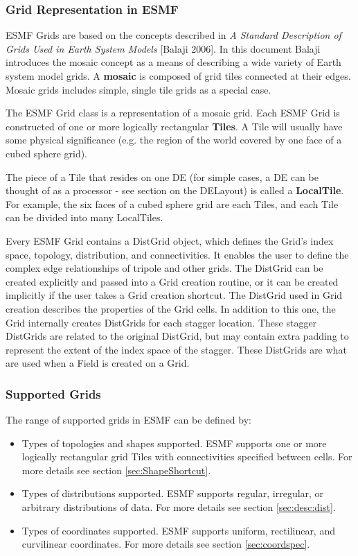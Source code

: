 \subsubsection{Grid Representation in ESMF}

ESMF Grids are based on the concepts described in {\it A Standard
Description of Grids Used in Earth System Models} [Balaji 2006].  In this document
Balaji introduces the mosaic concept as a means of describing
a wide variety of Earth system model grids.  A {\bf mosaic} is
composed of grid tiles connected at their edges.  Mosaic grids
includes simple, single tile grids as a special case.  

The ESMF Grid class is a representation of a mosaic grid.  Each ESMF
Grid is constructed of one or more logically rectangular {\bf Tiles}.
A Tile will usually have some physical significance (e.g. the region
of the world covered by one face of a cubed sphere grid).

The piece of a Tile that resides on one DE (for simple cases, a DE
can be thought of as a processor - see section on the DELayout)
is called a {\bf LocalTile}.  For example, the six faces of a cubed
sphere grid are each Tiles, and each Tile can be divided into many
LocalTiles.  

Every ESMF Grid contains a DistGrid object, which defines the Grid's
index space, topology, distribution, and connectivities.  It enables
the user to define the complex edge relationships of tripole and other
grids.  The DistGrid can be created explicitly and passed into a Grid
creation routine, or it can be created implicitly if the user takes
a Grid creation shortcut. The DistGrid used
in Grid creation describes the properties of the Grid cells. In addition
to this one, the Grid internally creates DistGrids for each stagger location. 
These stagger DistGrids are related to the original DistGrid, but may 
contain extra padding to represent the extent of the index space of
the stagger. These DistGrids are what are used when a Field is created 
on a Grid. 

\subsubsection{Supported Grids}

The range of supported grids in ESMF can be defined by:
\begin{itemize}
\item Types of topologies and shapes supported.  ESMF supports one or
more logically rectangular grid Tiles with connectivities specified
between cells.  For more details see section \ref{sec:ShapeShortcut}.
\item Types of distributions supported.  ESMF supports  regular,
irregular, or arbitrary distributions of data.  
For more details see section \ref{sec:desc:dist}.
\item Types of coordinates supported.  ESMF supports uniform, rectilinear,
and curvilinear coordinates.  For more details see section \ref{sec:coordspec}.
\end{itemize}

